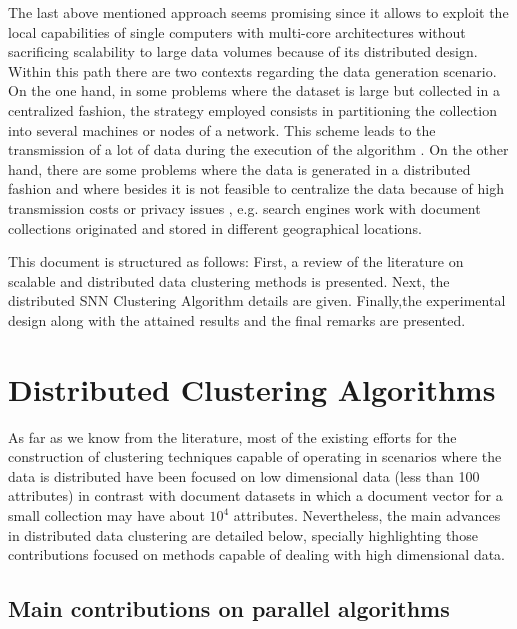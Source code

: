 \documentclass[a4paper]{article}
\begin{document}
The last above mentioned approach seems promising since it allows to exploit the local capabilities of single computers with multi-core architectures without sacrificing scalability to large data volumes because of its distributed design. Within this path there are two contexts regarding the data generation scenario. On the one hand, in some problems where the dataset is large but collected in a centralized fashion, the strategy employed consists in partitioning the collection into several machines or nodes of a network. This scheme leads to the transmission of a lot of data during the execution of the algorithm \cite{N15}. On the other hand, there are some problems where the data is generated in a distributed fashion and where besides it is not feasible to centralize the data because of high transmission costs or privacy issues \cite{JW05,LHLX12}, e.g. search engines work with document collections originated and stored in different geographical locations.

This document is structured as follows: First, a review of the literature on scalable and distributed data clustering methods is presented. Next, the distributed SNN Clustering Algorithm details are given. Finally,the experimental design along with the attained results and the final remarks are presented. 

\section{Distributed Clustering Algorithms}

As far as we know from the literature, most of the existing efforts for the construction of clustering techniques capable of operating in scenarios where the data is distributed have been focused on low dimensional data (less than 100 attributes) in contrast with document datasets in which a document vector for a small collection may have about $10^4$ attributes. Nevertheless, the main advances in distributed data clustering are detailed below, specially highlighting those contributions focused on methods capable of dealing with high dimensional data.


\subsection{Main contributions on parallel algorithms}
\end{document}
